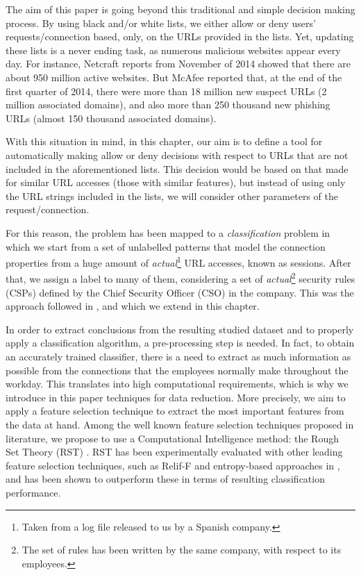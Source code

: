 \documentclass{llncs}
\begin{document}
The aim of this paper is going beyond this traditional and simple decision making process. By using black
and/or white lists, we either allow or deny users' requests/connection based, only, on the URLs provided in the lists.
Yet, updating these lists is a never ending task, as numerous malicious websites appear every day.
For instance, Netcraft reports from November of 2014 \cite{netcraft:site} showed that there are about 950
million active websites. But McAfee reported \cite{mcafee:site} that, at the end of the first quarter of 2014,
there were more than 18 million new suspect URLs (2 million associated domains), and also more than 250 thousand
new phishing URLs (almost 150 thousand associated domains).

With this situation in mind, in this chapter, our aim is to define a tool for automatically making allow or
deny decisions with respect to URLs that are not included in the aforementioned lists. This decision
would be based on that made for similar URL accesses (those with similar features), but instead of using only
the URL strings included in the lists, we will consider other parameters of the request/connection.

For this reason, the problem has been mapped to a \textit{classification} problem in which we start from a set of
unlabelled patterns that model the connection properties from a huge amount of \textit{actual}\footnote{Taken from a
log file released to   us by a  Spanish company.} URL accesses, known as sessions. After that, we assign a label to many
of them, considering a set of \textit{actual}\footnote{The set of rules has been written by the same   company, with respect
to its employees.} security rules (CSPs) defined by the Chief Security Officer (CSO) in the company. This was the approach
followed in \cite{ECTA}, and which we extend in this chapter.

In order to extract conclusions from the resulting studied dataset and to properly apply a classification algorithm,
a pre-processing step is needed. In fact, to obtain an accurately trained classifier, there is a need to extract as much
information as possible from the connections
that the employees normally make throughout the workday. This translates into high computational requirements, which is
why we introduce in this paper  techniques for data reduction. More precisely, we aim to apply a feature selection
technique to extract the most important features from the data at hand. Among the well known feature selection techniques
proposed in literature, we propose to use a Computational Intelligence method: the Rough Set Theory (RST) \cite{pawlak2008rough}. RST has been experimentally
evaluated with other leading feature selection techniques, such as Relif-F and entropy-based approaches
in \cite{jensen2007fuzzy}, and has been shown to outperform these in terms of resulting classification performance.
\end{document}
